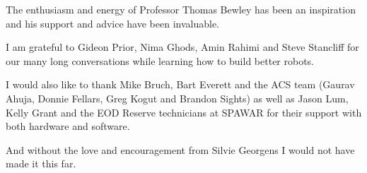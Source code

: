 \begin{frontmatter}
\tableofcontents
\listoffigures  %
\listoftables   %



\begin{acknowledgements}
The enthusiasm and energy of Professor Thomas Bewley has been an inspiration and his support and advice have been invaluable.

I am grateful to Gideon Prior, Nima Ghods, Amin Rahimi and Steve Stancliff for our many long conversations while learning how to build better robots.

I would also like to thank Mike Bruch, Bart Everett and the ACS team (Gaurav Ahuja, Donnie Fellars, Greg Kogut and Brandon Sights) as well as Jason Lum, Kelly Grant and the EOD Reserve technicians at SPAWAR for their support with both hardware and software.

And without the love and encouragement from Silvie Georgens I would not have made it this far.
\end{acknowledgements}




\end{frontmatter}
